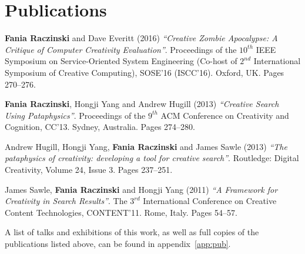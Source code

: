 
\pagestyle{empty}

\chapter{Publications}
\label{pre:pub}

\textbf{Fania Raczinski} and Dave Everitt (2016) \emph{``Creative Zombie Apocalypse: A Critique of Computer Creativity Evaluation''}. Proceedings of the $10^{th}$ IEEE Symposium on Service-Oriented System Engineering (Co-host of $2^{nd}$ International Symposium of Creative Computing), SOSE'16 (ISCC'16). Oxford, UK. Pages 270--276.

\textbf{Fania Raczinski}, Hongji Yang and Andrew Hugill (2013) \emph{``Creative Search Using Pataphysics''}. Proceedings of the $9^{th}$ ACM Conference on Creativity and Cognition, CC'13. Sydney, Australia. Pages 274--280.

Andrew Hugill, Hongji Yang, \textbf{Fania Raczinski} and James Sawle (2013) \emph{``The pataphysics of creativity: developing a tool for creative search''}. Routledge: Digital Creativity, Volume 24, Issue 3. Pages 237--251.

James Sawle, \textbf{Fania Raczinski} and Hongji Yang (2011) \emph{``A Framework for Creativity in Search Results''}. The $3^{rd}$ International Conference on Creative Content Technologies, CONTENT'11. Rome, Italy. Pages 54--57.

\spirals

A list of talks and exhibitions of this work, as well as full copies of the publications listed above, can be found in appendix~\ref{app:pub}.


\clearpage
